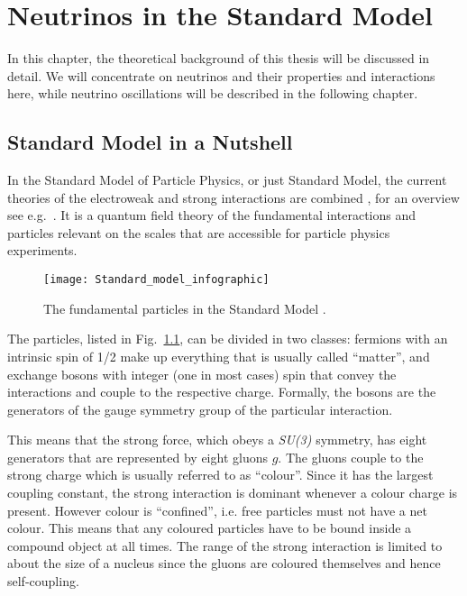 \chapter{Neutrinos in the Standard Model}
\label{sec:nus}

In this chapter, the theoretical background of this thesis will be discussed
in detail. We will concentrate on neutrinos and their properties and
interactions here, while neutrino oscillations will be described in the
following chapter.

\section{Standard Model in a Nutshell}
\label{sec:NusInSM}

In the Standard Model of Particle Physics, or just Standard Model, the current
theories of the electroweak and strong interactions are combined
\cite{SMGlashow, SMWeinberg, SMSalam, SMtHooft}, for an overview see e.g.\
\cite{SMtextbook}. It is a quantum field theory of the fundamental interactions
and particles relevant on the scales that are accessible for particle physics
experiments.

\begin{figure}
\centering
  \texttt{[image: Standard\_model\_infographic]}
\caption{The fundamental particles in the Standard Model \cite{SMchart}.}
\label{fig:SMchart}
\end{figure}

The particles, listed in Fig.~\ref{fig:SMchart}, can be divided in two classes:
fermions with an intrinsic spin of 1/2 make up everything that is usually called
``matter'', and exchange bosons with integer (one in most cases) spin that
convey the interactions and couple to the respective charge. Formally, the
bosons are the generators of the gauge symmetry group of the particular
interaction.

This means that the strong force, which obeys a \emph{SU(3)} symmetry, has eight
generators that are represented by eight gluons $g$. The gluons couple to the
strong charge which is usually referred to as ``colour''. Since it has the
largest coupling constant, the strong interaction is dominant whenever a
colour charge is present. However colour is ``confined'', i.e. free particles
must not have a net colour. This means that any coloured particles have to be
bound inside a compound object at all times. The range of the strong
interaction is limited to about the size of a nucleus since the gluons are
coloured themselves and hence self-coupling.

